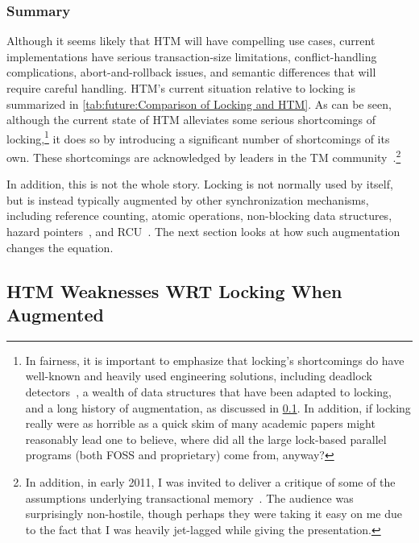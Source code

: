 \subsubsection{Summary}
\label{sec:future:HTM Weaknesses WRT Locking: Summary}



Although it seems likely that HTM will have compelling use cases,
current implementations have serious transaction-size limitations,
conflict-handling complications, abort-and-rollback issues, and
semantic differences that will require careful handling.
HTM's current situation relative to locking is summarized in
\cref{tab:future:Comparison of Locking and HTM}.
As can be seen, although the current state of HTM alleviates some
serious shortcomings of locking,\footnote{
	In fairness, it is important to emphasize that locking's shortcomings
	do have well-known and heavily used engineering solutions, including
	deadlock detectors~\cite{JonathanCorbet2006lockdep}, a wealth
	of data structures that have been adapted to locking, and
	a long history of augmentation, as discussed in
	\cref{sec:future:HTM Weaknesses WRT Locking When Augmented}.
	In addition, if locking really were as horrible as a quick skim
	of many academic papers might reasonably lead one to believe,
	where did all the large lock-based parallel programs (both
	FOSS and proprietary) come from, anyway?}
it does so by introducing a significant
number of shortcomings of its own.
These shortcomings are acknowledged by leaders in the TM
community~\cite{AlexanderMatveev2012PessimisticTM}.\footnote{
	In addition, in early 2011, I was invited to deliver a critique of
	some of the assumptions underlying transactional
	memory~\cite{PaulEMcKenney2011Verico}.
	The audience was surprisingly non-hostile, though perhaps they
	were taking it easy on me due to the fact that I was heavily
	jet-lagged while giving the presentation.}

In addition, this is not the whole story.
Locking is not normally used by itself, but is instead typically
augmented by other synchronization mechanisms,
including reference counting, atomic operations, non-blocking data structures,
hazard pointers~\cite{MagedMichael04a,HerlihyLM02},
and RCU~\cite{McKenney98,McKenney01a,ThomasEHart2007a,PaulEMcKenney2012ELCbattery}.
The next section looks at how such augmentation changes the equation.

\subsection{HTM Weaknesses WRT Locking When Augmented}
\label{sec:future:HTM Weaknesses WRT Locking When Augmented}

